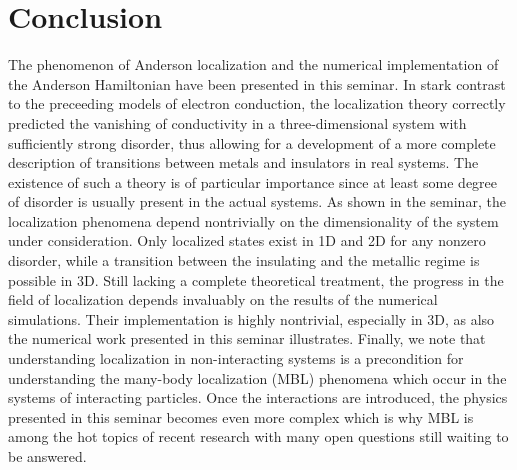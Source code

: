 \documentclass[10pt,a4paper]{article}
\begin{document}
\section{Conclusion}
\label{sec:conc}
The phenomenon of Anderson localization and the numerical implementation of the Anderson Hamiltonian have been presented in this seminar. In stark contrast to the preceeding models of electron conduction, the localization theory correctly predicted the vanishing of conductivity in a three-dimensional system with sufficiently strong disorder, thus allowing for a development of a more complete description of transitions between metals and insulators in real systems. The existence of such a theory is of particular importance since at least some degree of disorder is usually present in the actual systems. As shown in the seminar, the localization phenomena depend nontrivially on the dimensionality of the system under consideration. Only localized states exist in 1D and 2D for any nonzero disorder, while a transition between the insulating and the metallic regime is possible in 3D. Still lacking a complete theoretical treatment, the progress in the field of localization depends invaluably on the results of the numerical simulations. Their implementation is highly nontrivial, especially in 3D, as also the numerical work presented in this seminar illustrates. Finally, we note that understanding localization in non-interacting systems is a precondition for understanding the many-body localization (MBL) phenomena which occur in the systems of interacting particles. Once the interactions are introduced, the physics presented in this seminar becomes even more complex which is why MBL is among the hot topics of recent research with many open questions still waiting to be answered. 
\end{document}
